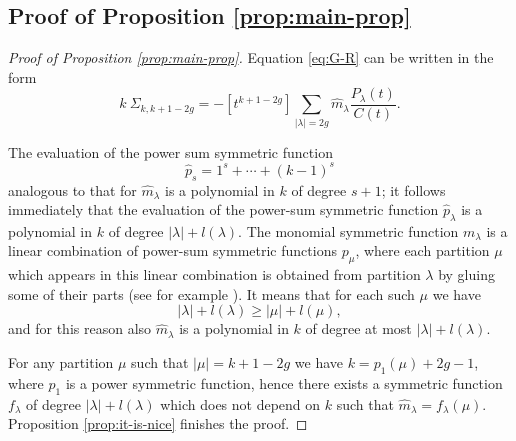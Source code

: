 \documentclass[12pt]{amsart}
\theoremstyle{plain}
\newtheorem{theorem}[lemma]{Theorem}
\theoremstyle{remark}
\begin{document}
%
%
%

\subsection{Proof of Proposition \ref{prop:main-prop}}
\begin{proof}[Proof of Proposition \ref{prop:main-prop}]
Equation \eqref{eq:G-R} can be written in the form
$$k\
\Sigma_{k,k+1-2g}=-[t^{k+1-2g}]
\sum_{|\lambda| = 2g}\hat{m}_{\lambda}
\frac{P_{\lambda}(t)}{C(t)}.$$

The evaluation of the power sum symmetric function 
$$ \hat{p}_s = 1^s + \cdots + (k-1)^s$$
analogous to that for
$\hat{m}_\lambda$ is a polynomial in $k$ of degree $s+1$; it follows immediately
that the
evaluation of the power-sum symmetric function $\hat{p}_\lambda$ is a
polynomial in $k$ of degree $|\lambda|+l(\lambda)$. The monomial symmetric
function $m_{\lambda}$ is a linear combination of power-sum symmetric functions
$p_{\mu}$, where each partition $\mu$ which appears in this linear combination
is obtained from partition $\lambda$ by gluing some of their parts (see for
example \cite{Macdonald1995}). It
means that for each such $\mu$ we have
$$|\lambda|+l(\lambda) \geq  |\mu|+l(\mu),$$
and for this reason also 
$\hat{m}_\lambda$ is a polynomial in $k$ of degree at
most $|\lambda|+l(\lambda)$.

For any partition $\mu$ such that $|\mu| = k + 1-  2g $ we have $k =
p_1(\mu) + 2g -1$, where $p_1$ is a power symmetric function, hence
there exists a symmetric function $f_{\lambda}$ of degree
$|\lambda|+l(\lambda)$ which does not depend on $k$ such that $\hat{m}_{\lambda}
= f_{\lambda}(\mu)$.
Proposition \ref{prop:it-is-nice}
finishes the proof.
\end{proof}
\end{document}
